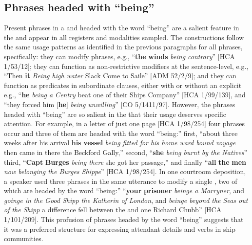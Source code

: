 \subsection{{Phrases headed with “being”}}%

Present  phrases in a  and headed with the word “being” are a salient feature in the  and appear in all registers and modalities sampled. The  constructions follow the same usage patterns as identified in the previous paragraphs for all  phrases, specifically: they can modify  phrases, e.g., “\textbf{the} \textbf{winds} \textit{being contrary}” [HCA 1/53/12]; they can function as non-restrictive modifiers at the sentence-level, e.g., “Then \textbf{it} \textit{Being high water} Slack Come to Saile” [ADM 52/2/9]; and they can function as predicates in subordinate clauses, either with or without an explicit  e.g., “\textbf{he} \textit{being a Centry} beat one of their Ships Company” [HCA 1/99/139], and “they forced him [\textbf{he}] \textit{being unwilling}” [CO 5/1411/97]. However, the  phrases headed with “being” are so salient in the  that their usage deserves specific attention. For example, in a letter of just one page [HCA 1/98/254] four  phrases occur and three of them are headed with the word “being:” first, “about three weeks after his arrival \textbf{his} \textbf{vessel} \textit{being fitted for his home ward bound voyage} then came in there the Beckford Gally,” second, “\textbf{she} \textit{being burnt by the Natives}” third, “\textbf{Capt} \textbf{Burges} \textit{being there} she got her passage,” and finally “\textbf{all} \textbf{the} \textbf{men} \textit{now belonging the Burges Shippe}” [HCA 1/98/254]. In one courtroom deposition, a speaker used three  phrases in the same utterance to modify a single , two of which are headed by the word “being:” “\textbf{your} \textbf{prisoner} \textit{beinge a Marryner}, and \textit{goinge in the Good Shipp the Katherin of London}, and \textit{beinge beyond the Seas out of the Shipp} a difference fell between the  and one Richard Chubb” [HCA 1/101/209]. This profusion of  phrases headed by the word “being” suggests that it was a preferred structure for expressing attendant details and  verbs in ship communities. 

